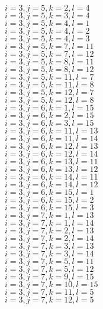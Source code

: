 \documentclass[14pt]{article}
\begin{document}
    $i=3,j=5,k=2,l=4 $ \\ 
    $i=3,j=5,k=3,l=4 $ \\ 
    $i=3,j=5,k=4,l=1 $ \\ 
    $i=3,j=5,k=4,l=2 $ \\ 
    $i=3,j=5,k=4,l=3 $ \\ 
    $i=3,j=5,k=7,l=11 $ \\ 
    $i=3,j=5,k=7,l=12 $ \\ 
    $i=3,j=5,k=8,l=11 $ \\ 
    $i=3,j=5,k=8,l=12 $ \\ 
    $i=3,j=5,k=11,l=7 $ \\ 
    $i=3,j=5,k=11,l=8 $ \\ 
    $i=3,j=5,k=12,l=7 $ \\ 
    $i=3,j=5,k=12,l=8 $ \\ 
    $i=3,j=6,k=1,l=15 $ \\ 
    $i=3,j=6,k=2,l=15 $ \\ 
    $i=3,j=6,k=3,l=15 $ \\ 
    $i=3,j=6,k=11,l=13 $ \\ 
    $i=3,j=6,k=11,l=14 $ \\ 
    $i=3,j=6,k=12,l=13 $ \\ 
    $i=3,j=6,k=12,l=14 $ \\ 
    $i=3,j=6,k=13,l=11 $ \\ 
    $i=3,j=6,k=13,l=12 $ \\ 
    $i=3,j=6,k=14,l=11 $ \\ 
    $i=3,j=6,k=14,l=12 $ \\ 
    $i=3,j=6,k=15,l=1 $ \\ 
    $i=3,j=6,k=15,l=2 $ \\ 
    $i=3,j=6,k=15,l=3 $ \\ 
    $i=3,j=7,k=1,l=13 $ \\ 
    $i=3,j=7,k=1,l=14 $ \\ 
    $i=3,j=7,k=2,l=13 $ \\ 
    $i=3,j=7,k=2,l=14 $ \\ 
    $i=3,j=7,k=3,l=13 $ \\ 
    $i=3,j=7,k=3,l=14 $ \\ 
    $i=3,j=7,k=5,l=11 $ \\ 
    $i=3,j=7,k=5,l=12 $ \\ 
    $i=3,j=7,k=9,l=15 $ \\ 
    $i=3,j=7,k=10,l=15 $ \\ 
    $i=3,j=7,k=11,l=5 $ \\ 
    $i=3,j=7,k=12,l=5 $ \\ 
\end{document}

